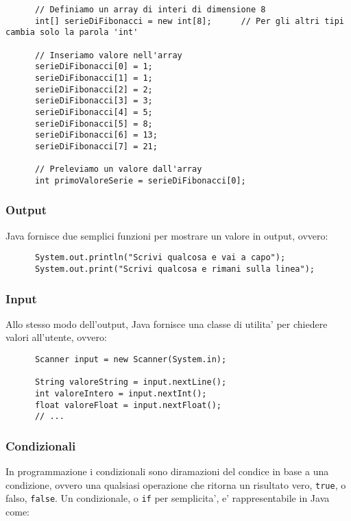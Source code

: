 \documentclass{article}
\begin{document}
{    \begin{verbatim}
      // Definiamo un array di interi di dimensione 8
      int[] serieDiFibonacci = new int[8];      // Per gli altri tipi cambia solo la parola 'int'

      // Inseriamo valore nell'array
      serieDiFibonacci[0] = 1;
      serieDiFibonacci[1] = 1;
      serieDiFibonacci[2] = 2;
      serieDiFibonacci[3] = 3;
      serieDiFibonacci[4] = 5;
      serieDiFibonacci[5] = 8;
      serieDiFibonacci[6] = 13;
      serieDiFibonacci[7] = 21;

      // Preleviamo un valore dall'array
      int primoValoreSerie = serieDiFibonacci[0];
    \end{verbatim}

    \subsubsection{Output} %
    Java fornisce due semplici funzioni per mostrare un valore in output, ovvero:

    \begin{verbatim}
      System.out.println("Scrivi qualcosa e vai a capo");
      System.out.print("Scrivi qualcosa e rimani sulla linea");
    \end{verbatim}

    \subsubsection{Input} %
    Allo stesso modo dell'output, Java fornisce una classe di utilita' per chiedere valori all'utente, ovvero:

    \begin{verbatim}
      Scanner input = new Scanner(System.in);

      String valoreString = input.nextLine();
      int valoreIntero = input.nextInt();
      float valoreFloat = input.nextFloat();
      // ...
    \end{verbatim}

    \subsubsection{Condizionali} %
    In programmazione i condizionali sono diramazioni del condice in base a una condizione, ovvero una qualsiasi operazione che ritorna un risultato vero, \texttt{true}, o falso, \texttt{false}. Un condizionale, o \texttt{if} per semplicita', e' rappresentabile in Java come:

}
\end{document}
